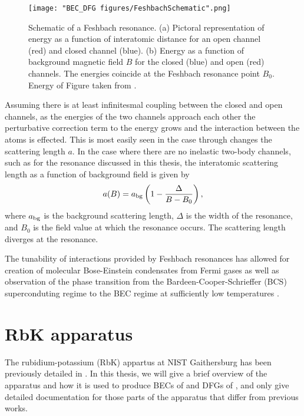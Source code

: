 \begin{figure}
	\texttt{[image: "BEC\_DFG figures/FeshbachSchematic".png]}
\caption{Schematic of a Feshbach resonance. (a) Pictoral representation of energy as a function of interatomic distance for an open channel (red) and closed channel (blue). (b) Energy as a function of background magnetic field $B$ for the closed (blue) and open (red) channels. The energies coincide at the Feshbach resonance point $B_0$. Energy of Figure taken from \cite{KetterleDFG}.}
\label{fig:FeshbachSchematic}
\end{figure}

Assuming there is at least infinitesmal coupling between the closed and open channels, as the energies of the two channels approach each other the perturbative correction term to the energy grows and the interaction between the atoms is effected. This is most easily seen in the \swave{} case through changes the scattering length $a$. In the case where there are no inelastic two-body channels, such as for the \K{} resonance discussed in this thesis, the interatomic scattering length as a function of background field is given by\cite{Chin10}
\begin{equation}
a(B)=a_{\rm{bg}}\left(1-\frac{\Delta}{B-B_0}\right),
\label{eqn:feshbach}
\end{equation}
where $a_{\rm{bg}}$ is the background scattering length, $\Delta$ is the width of the resonance, and $B_0$ is the field value at which the resonance occurs. The scattering length diverges at the resonance.

The tunability of interactions provided by Feshbach resonances has allowed for creation of molecular Bose-Einstein condensates from Fermi gases \cite{Greiner03,Zwierlein03, Jochim03} as well as observation of the phase transition from the Bardeen-Cooper-Schrieffer (BCS) superconduting regime to the BEC regime at sufficiently low temperatures \cite{Bartenstein04, Bourdel04, Zwierlein04, Regal04}.

\section{RbK apparatus}

The rubidium-potassium (RbK) appartus at NIST Gaithersburg has been previously detailed in \cite{Lin2009,KarinaThesis, AycockThesis}. In this thesis, we will give a brief overview of the apparatus and how it is used to produce BECs of \Rb{} and DFGs of \K{}, and only give detailed documentation for those parts of the apparatus that differ from previous works. 


